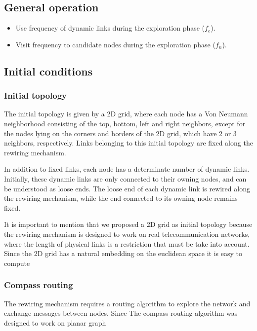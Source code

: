 \subsection{General operation}

\begin{itemize}
    \item Use frequency of dynamic links during the exploration phase ($f_e$).
    \item Visit frequency to candidate nodes during the exploration phase ($f_n$).
\end{itemize}

\subsection{Initial conditions}

\subsubsection{Initial topology} 
The initial topology is given by a 2D grid, where each node has a Von Neumann neighborhood consisting of the top, bottom, left and right neighbors, except for the nodes lying on the corners and borders of the 2D grid, which have 2 or 3 neighbors, respectively. Links belonging to this initial topology are fixed along the rewiring mechanism. 

In addition to fixed links, each node has a determinate number of dynamic links. Initially, these dynamic links are only connected to their owning nodes, and can be understood as loose ends. The loose end of each dynamic link is rewired along the rewiring mechanism, while the end connected to its owning node remains fixed. 

It is important to mention that we proposed a 2D grid as initial topology because the rewiring mechanism is designed to work on real telecommunication networks, where the length of physical links is a restriction that must be take into account. Since the 2D grid has a natural embedding on the euclidean space it is easy to compute 

\subsubsection{Compass routing}

The rewiring mechanism requires a routing algorithm to explore the network and exchange messages between nodes. Since 
The compass routing algorithm was designed to work on planar graph



